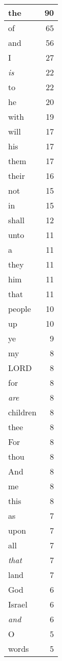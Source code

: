 \begin{center}
\begin{longtable}{l|r}
\hline \hline
\endlastfoot
the & 90 \\ \hline
of & 65 \\ \hline
and & 56 \\ \hline
I & 27 \\ \hline
\emph{is} & 22 \\ \hline
to & 22 \\ \hline
he & 20 \\ \hline
with & 19 \\ \hline
will & 17 \\ \hline
his & 17 \\ \hline
them & 17 \\ \hline
their & 16 \\ \hline
not & 15 \\ \hline
in & 15 \\ \hline
shall & 12 \\ \hline
unto & 11 \\ \hline
a & 11 \\ \hline
they & 11 \\ \hline
him & 11 \\ \hline
that & 11 \\ \hline
people & 10 \\ \hline
up & 10 \\ \hline
ye & 9 \\ \hline
my & 8 \\ \hline
LORD & 8 \\ \hline
for & 8 \\ \hline
\emph{are} & 8 \\ \hline
children & 8 \\ \hline
thee & 8 \\ \hline
For & 8 \\ \hline
thou & 8 \\ \hline
And & 8 \\ \hline
me & 8 \\ \hline
this & 8 \\ \hline
as & 7 \\ \hline
upon & 7 \\ \hline
all & 7 \\ \hline
\emph{that} & 7 \\ \hline
land & 7 \\ \hline
God & 6 \\ \hline
Israel & 6 \\ \hline
\emph{and} & 6 \\ \hline
O & 5 \\ \hline
words & 5 \\ \hline

\end{longtable}
\end{center}
